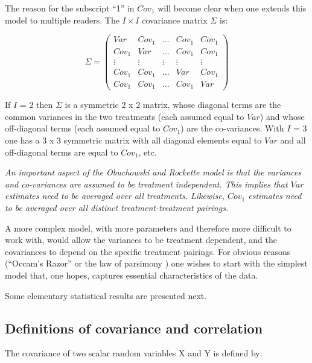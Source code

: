\documentclass[
]{book}
\begin{document}
The reason for the subscript ``1'' in \(Cov_1\) will become clear when one extends this model to multiple readers. The \(I \times I\) covariance matrix \(\Sigma\) is:

\begin{equation}
\Sigma=
\begin{pmatrix}
Var & Cov_1   & \ldots & Cov_1 & Cov_1 \\
Cov_1 & Var   & \ldots &Cov_1 & Cov_1 \\
\vdots & \vdots & \vdots & \vdots & \vdots \\
Cov_1 & Cov_1 & \ldots & Var & Cov_1 \\
Cov_1 & Cov_1 & \ldots & Cov_1 & Var
\end{pmatrix}
\label{eq:ExampleSigma}
\end{equation}

If \(I\) = 2 then \(\Sigma\) is a symmetric 2 x 2 matrix, whose diagonal terms are the common variances in the two treatments (each assumed equal to \(Var\)) and whose off-diagonal terms (each assumed equal to \(Cov_1\)) are the co-variances. With \(I\) = 3 one has a 3 x 3 symmetric matrix with all diagonal elements equal to \(Var\) and all off-diagonal terms are equal to \(Cov_1\), etc.

\emph{An important aspect of the Obuchowski and Rockette model is that the variances and co-variances are assumed to be treatment independent. This implies that \(Var\) estimates need to be averaged over all treatments. Likewise, \(Cov_1\) estimates need to be averaged over all distinct treatment-treatment pairings.}

A more complex model, with more parameters and therefore more difficult to work with, would allow the variances to be treatment dependent, and the covariances to depend on the specific treatment pairings. For obvious reasons (``Occam's Razor'' or the law of parsimony ) one wishes to start with the simplest model that, one hopes, captures essential characteristics of the data.

Some elementary statistical results are presented next.

\hypertarget{definitions-of-covariance-and-correlation}{%
\subsection{Definitions of covariance and correlation}\label{definitions-of-covariance-and-correlation}}

The covariance of two scalar random variables X and Y is defined by:
\end{document}
